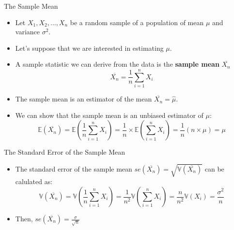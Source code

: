 \documentclass[handout]{beamer}
\begin{document}
\begin{frame}{The Sample Mean}
\scriptsize{

\begin{itemize}
 \item Let $X_1,X_2,\dots,X_n$ be a random sample of a population of mean $\mu$ and variance $\sigma^2$.
 \item Let's suppose that we are interested in estimating $\mu$.
 \item  A sample statistic we can derive from the data is the  \textbf{sample mean} $\overline{X_{n}}$
 \begin{displaymath}
  \overline{X_{n}}=\frac{1}{n}\sum_{i=1}^{n} X_i
 \end{displaymath}
 \item The sample mean is an estimator of the mean $\overline{X_{n}} = \hat{\mu}$.

\item We can show that the sample mean is an unbiased estimator of $\mu$:
\begin{displaymath}
\mathbb{E}(\overline{X_{n}}) = \mathbb{E}(\frac 1n \sum_{i=1}^{n} X_i)  =  \frac 1n \times \mathbb{E}(\sum_{i=1}^{n} X_i) = \frac 1n (n \times \mu) = \mu  
\end{displaymath}
\end{itemize}

} 
\end{frame}

\begin{frame}{The Standard Error of the Sample Mean}
\scriptsize{

\begin{itemize}
\item The standard error of the sample mean $se(\overline{X_{n}}) = \sqrt{\mathbb{V}(\overline{X_{n}})}$ can be calulated as:
\begin{displaymath}
 \mathbb{V}(\overline{X_{n}})=\mathbb{V}(\frac 1n \sum_{i=1}^{n} X_i) = \frac{1}{n^2} \mathbb{V}(\sum_{i=1}^{n} X_i) = \frac{n}{n^2} \mathbb{V}(X_i)=\frac{\sigma^2}{n} 
\end{displaymath}

\item Then,  $se(\overline{X_{n}}) = \frac{\sigma}{\sqrt{n}}$

\end{itemize}


} 
\end{frame}
\end{document}
